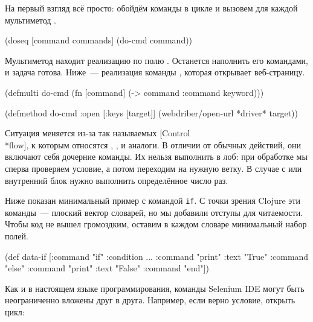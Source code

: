На первый взгляд всё просто: обойдём команды в цикле и вызовем для каждой
мультиметод .

\begin{clojure}
(doseq [command commands]
  (do-cmd command))
\end{clojure}

Мультиметод находит реализацию по полю . Останется наполнить его
командами, и задача готова. Ниже~--- реализация команды , которая
открывает веб-страницу.

\iflarge\vspace{15mm}\pagebreak[4]\fi

\begin{clojure}
(defmulti do-cmd
  (fn [command]
    (-> command :command keyword)))

(defmethod do-cmd :open
  [{:keys [target]}]
  (webdriber/open-url *driver* target))
\end{clojure}

Ситуация меняется из-за так называемых
[Control\\*flow],
к которым относятся , ,  и аналоги. В отличии от
обычных действий, они включают себя дочерние команды. Их нельзя выполнить в лоб:
при обработке  мы сперва проверяем условие, а потом переходим на нужную
ветку. В случае с  или  внутренний блок нужно выполнить
определённое число раз.


Ниже показан минимальный пример с командой \texttt{if}. С точки зрения Clojure
эти команды~--- плоский вектор словарей, но мы добавили отступы для
читаемости. Чтобы код не вышел громоздким, оставим в каждом словаре минимальный
набор полей.

\begin{clojure}
(def data-if
  [{:command "if" :condition ...}
     {:command "print" :text "True"}
   {:command "else"}
     {:command "print" :text "False"}
   {:command "end"}])
\end{clojure}

Как и в настоящем языке программирования, команды Selenium IDE могут быть
неограниченно вложены друг в друга. Например, если верно условие, открыть цикл:

\begin{clojure}
\end{clojure}

